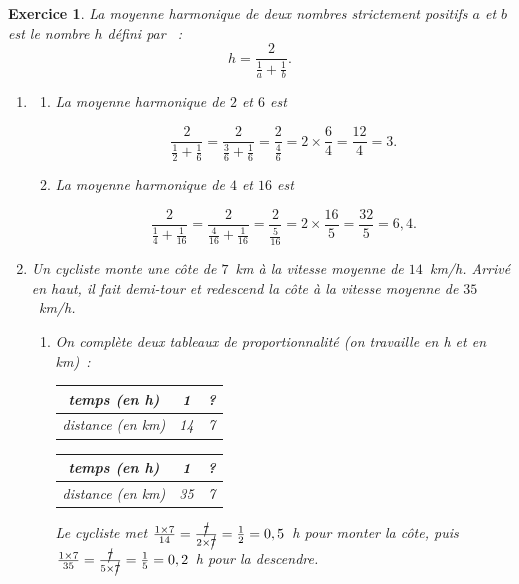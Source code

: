 \documentclass[10pt]{article}
\newtheorem{exo}{Exercice}
\begin{document}
\begin{exo}

La moyenne harmonique de deux nombres strictement positifs $a$ et $b$ est le nombre $h$ défini par~ :
\[h=\frac{2}{\frac{1}{a}+\frac{1}{b}}.\]
\begin{enumerate}


\item 
\begin{enumerate}
\item La moyenne harmonique de $2$ et $6$ est

\[\frac{2}{\frac{1}{2}+\frac{1}{6}}=\frac{2}{\frac{3}{6}+\frac{1}{6}}=\frac{2}{\frac{4}{6}}=2\times\frac{6}{4}=\frac{12}{4}=3.\]
\item La moyenne harmonique de $4$ et $16$ est

\[\frac{2}{\frac{1}{4}+\frac{1}{16}}=\frac{2}{\frac{4}{16}+\frac{1}{16}}=\frac{2}{\frac{5}{16}}=2\times\frac{16}{5}=\frac{32}{5}=6,4.\]
\end{enumerate}
\item Un cycliste monte une côte de $7$~km à la vitesse moyenne de $14$~km/h. Arrivé en haut, il fait demi-tour et redescend la côte à la vitesse moyenne de $35$~km/h.

\begin{enumerate}
\item On complète deux tableaux de proportionnalité (on travaille en h et en km)~:

\begin{multicols}{2}

\begin{center}
\begin{tabular}{|c|c|c|}\hline
temps (en h)& 1&? \\ \hline 
distance (en km)&14& 7 \\ \hline
\end{tabular}


\begin{tabular}{|c|c|c|}\hline
temps (en h)& 1&? \\ \hline 
distance (en km)&35& 7 \\ \hline
\end{tabular}
\end{center}

\end{multicols}

Le cycliste met $\frac{1\times 7}{14}=\frac{\cancel{7}}{2\times\cancel{7}}=\frac{1}{2}=0,5$~h pour monter la côte, puis $\frac{1\times 7}{35}=\frac{\cancel{7}}{5\times\cancel{7}}=\frac{1}{5}=0,2$~h pour la descendre.


\end{enumerate}
\end{enumerate}
\end{exo}
\end{document}
